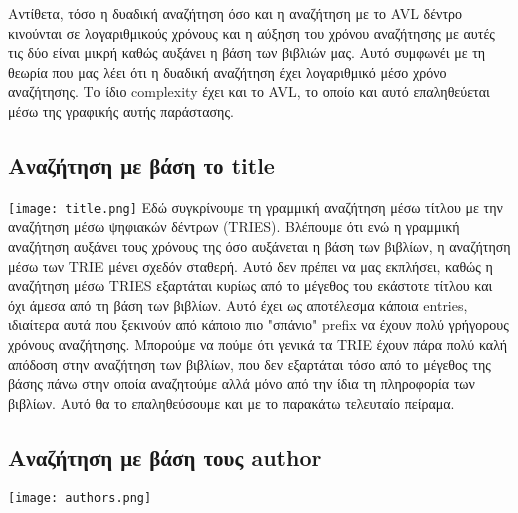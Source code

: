 \documentclass[a4paper]{article}
\begin{document}
Αντίθετα, τόσο η δυαδική αναζήτηση όσο και η αναζήτηση με το AVL δέντρο κινούνται σε λογαριθμικούς χρόνους και η αύξηση του χρόνου αναζήτησης με αυτές τις δύο είναι μικρή καθώς αυξάνει η βάση των βιβλιών μας.
Αυτό συμφωνέι με τη θεωρία που μας λέει ότι η δυαδική αναζήτηση έχει λογαριθμικό μέσο χρόνο αναζήτησης. Το ίδιο complexity έχει και το AVL, το οποίο και αυτό επαληθεύεται μέσω της γραφικής αυτής παράστασης.
 
\subsection{Αναζήτηση με βάση το title}
\texttt{[image: title.png]}
Εδώ συγκρίνουμε τη γραμμική αναζήτηση μέσω τίτλου με την αναζήτηση μέσω ψηφιακών δέντρων (TRIES). Βλέπουμε ότι ενώ η γραμμική αναζήτηση αυξάνει τους χρόνους της όσο αυξάνεται η βάση των βιβλίων, η αναζήτηση μέσω των TRIE μένει σχεδόν σταθερή.
Αυτό δεν πρέπει να μας εκπλήσει, καθώς η αναζήτηση μέσω TRIES εξαρτάται κυρίως από το μέγεθος του εκάστοτε τίτλου και όχι άμεσα από τη βάση των βιβλίων.
Αυτό έχει ως αποτέλεσμα κάποια entries, ιδιαίτερα αυτά που ξεκινούν από κάποιο πιο "σπάνιο" prefix να έχουν πολύ γρήγορους χρόνους αναζήτησης. Μπορούμε να πούμε ότι γενικά τα TRIE έχουν πάρα πολύ καλή απόδοση στην αναζήτηση των βιβλίων, που δεν εξαρτάται τόσο από το μέγεθος της βάσης πάνω στην οποία αναζητούμε αλλά μόνο από την ίδια τη πληροφορία των βιβλίων.
Αυτό θα το επαληθεύσουμε και με το παρακάτω τελευταίο πείραμα.
\subsection{Αναζήτηση με βάση τους author}
\texttt{[image: authors.png]}
\end{document}
